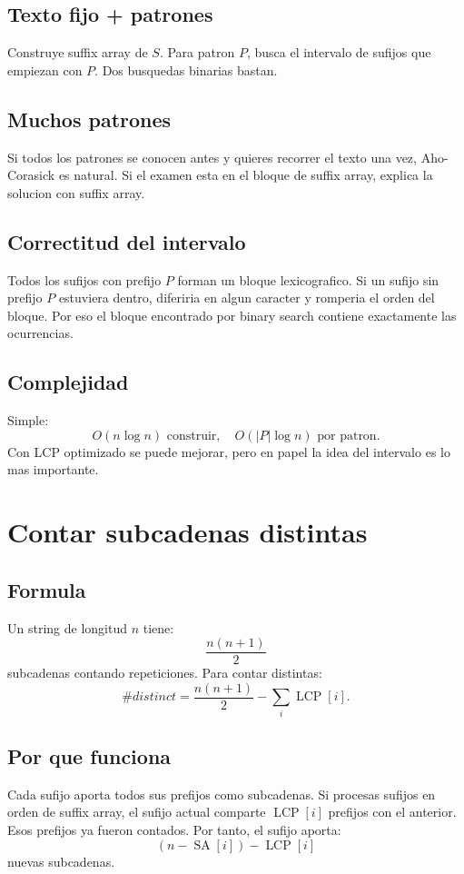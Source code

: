 \documentclass[10pt]{article}
\newcommand{\bigO}{O}
\newcommand{\SA}{\operatorname{SA}}
\newcommand{\LCP}{\operatorname{LCP}}
\begin{document}
\subsection{Texto fijo + patrones}
Construye suffix array de $S$. Para patron $P$, busca el intervalo de sufijos
que empiezan con $P$. Dos busquedas binarias bastan.

\subsection{Muchos patrones}
Si todos los patrones se conocen antes y quieres recorrer el texto una vez,
Aho-Corasick es natural. Si el examen esta en el bloque de suffix array, explica
la solucion con suffix array.

\subsection{Correctitud del intervalo}
Todos los sufijos con prefijo $P$ forman un bloque lexicografico. Si un sufijo
sin prefijo $P$ estuviera dentro, diferiria en algun caracter y romperia el orden
del bloque. Por eso el bloque encontrado por binary search contiene exactamente
las ocurrencias.

\subsection{Complejidad}
Simple:
\[
\bigO(n\log n)\text{ construir},\quad \bigO(|P|\log n)\text{ por patron}.
\]
Con LCP optimizado se puede mejorar, pero en papel la idea del intervalo es lo
mas importante.

\newpage
\section{Contar subcadenas distintas}

\subsection{Formula}
Un string de longitud $n$ tiene:
\[
\frac{n(n+1)}2
\]
subcadenas contando repeticiones. Para contar distintas:
\[
\#distinct = \frac{n(n+1)}2 - \sum_i \LCP[i].
\]

\subsection{Por que funciona}
Cada sufijo aporta todos sus prefijos como subcadenas. Si procesas sufijos en
orden de suffix array, el sufijo actual comparte $\LCP[i]$ prefijos con el
anterior. Esos prefijos ya fueron contados. Por tanto, el sufijo aporta:
\[
(n-\SA[i])-\LCP[i]
\]
nuevas subcadenas.
\end{document}
